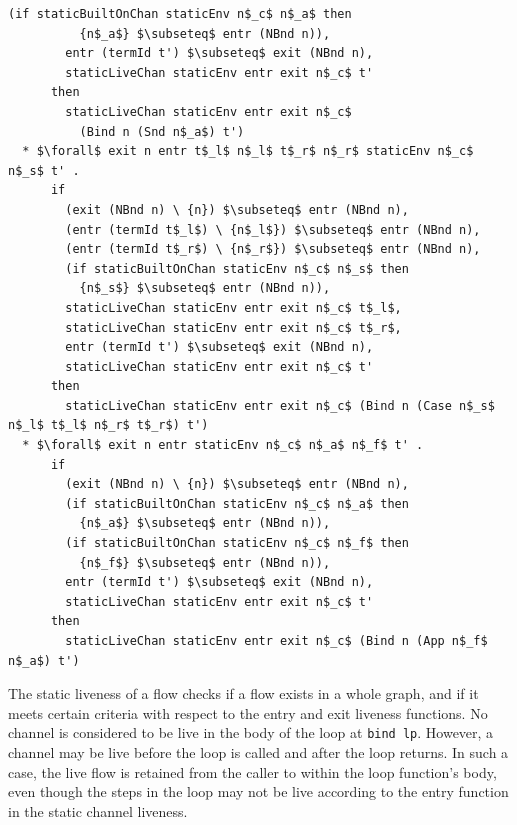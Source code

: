 \documentclass[letterpaper, 11pt]{extarticle}
\begin{document}
\begin{lstlisting}[language=logic, mathescape]
        (if staticBuiltOnChan staticEnv n$_c$ n$_a$ then
          {n$_a$} $\subseteq$ entr (NBnd n)),
        entr (termId t') $\subseteq$ exit (NBnd n),
        staticLiveChan staticEnv entr exit n$_c$ t'
      then
        staticLiveChan staticEnv entr exit n$_c$
          (Bind n (Snd n$_a$) t')
  * $\forall$ exit n entr t$_l$ n$_l$ t$_r$ n$_r$ staticEnv n$_c$ n$_s$ t' .
      if 
        (exit (NBnd n) \ {n}) $\subseteq$ entr (NBnd n),
        (entr (termId t$_l$) \ {n$_l$}) $\subseteq$ entr (NBnd n),
        (entr (termId t$_r$) \ {n$_r$}) $\subseteq$ entr (NBnd n),
        (if staticBuiltOnChan staticEnv n$_c$ n$_s$ then
          {n$_s$} $\subseteq$ entr (NBnd n)),
        staticLiveChan staticEnv entr exit n$_c$ t$_l$,
        staticLiveChan staticEnv entr exit n$_c$ t$_r$,
        entr (termId t') $\subseteq$ exit (NBnd n),
        staticLiveChan staticEnv entr exit n$_c$ t'
      then 
        staticLiveChan staticEnv entr exit n$_c$ (Bind n (Case n$_s$ n$_l$ t$_l$ n$_r$ t$_r$) t')
  * $\forall$ exit n entr staticEnv n$_c$ n$_a$ n$_f$ t' .
      if
        (exit (NBnd n) \ {n}) $\subseteq$ entr (NBnd n),
        (if staticBuiltOnChan staticEnv n$_c$ n$_a$ then
          {n$_a$} $\subseteq$ entr (NBnd n)),
        (if staticBuiltOnChan staticEnv n$_c$ n$_f$ then
          {n$_f$} $\subseteq$ entr (NBnd n)),
        entr (termId t') $\subseteq$ exit (NBnd n),
        staticLiveChan staticEnv entr exit n$_c$ t'
      then
        staticLiveChan staticEnv entr exit n$_c$ (Bind n (App n$_f$ n$_a$) t')
\end{lstlisting}

The static liveness of a flow checks if a flow exists in a whole graph,
and if it meets certain criteria with respect to the entry and exit liveness
functions. 
No channel is considered to be live in the body of the loop at \lstinline[language=normal_lang]{bind lp}.
However, a channel may be live before the loop is
called and after the loop returns. In such a case, the live flow is retained
from the caller to within the loop function's body, even though the steps in
the loop may not be live according to the entry function in the static channel liveness.
\end{document}
